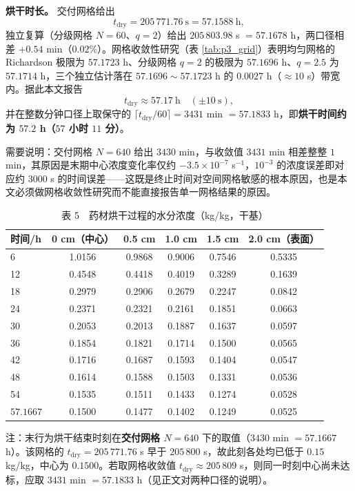 \textbf{烘干时长。} 交付网格给出
\begin{equation}
  t_{\text{dry}}=205\,771.76\ \text{s}=57.1588\ \text{h},
\end{equation}
独立复算（分级网格 $N=60$、$q=2$）给出 $205\,803.98$ s $=57.1678$ h，两口径相差 $+0.54$ min（$0.02\%$）。网格收敛性研究（表 \ref{tab:p3_grid}）表明均匀网格的 Richardson 极限为 $57.1723$ h、分级网格 $q=2$ 的极限为 $57.1696$ h、$q=2.5$ 为 $57.1714$ h，三个独立估计落在 $57.1696\sim57.1723$ h 的 $0.0027$ h（$\approx10$ s）带宽内。据此本文报告
\begin{equation}
  t_{\text{dry}}\approx57.17\ \text{h}\quad(\pm10\ \text{s}),
\end{equation}
并在整数分钟口径上取保守的 $\lceil t_{\text{dry}}/60\rceil=3431$ min $=57.1833$ h，即\textbf{烘干时间约为 $57.2$ h（$57$ 小时 $11$ 分）}。

需要说明：交付网格 $N=640$ 给出 $3430$ min，与收敛值 $3431$ min 相差整整 $1$ min，其原因是末期中心浓度变化率仅约 $-3.5\times10^{-7}$ s$^{-1}$，$10^{-3}$ 的浓度误差即对应约 $3000$ s 的时间误差——这既是终止时间对空间网格敏感的根本原因，也是本文必须做网格收敛性研究而不能直接报告单一网格结果的原因。

\begin{table}[H]
  \centering
  \caption{表 5　药材烘干过程的水分浓度（kg/kg，干基）}
  \label{tab:p3_tab5}
  \begin{tabular}{lccccc}
    \toprule
    时间/h & 0 cm（中心） & 0.5 cm & 1.0 cm & 1.5 cm & 2.0 cm（表面） \\
    \midrule
    6  & 1.0156 & 0.9868 & 0.9006 & 0.7546 & 0.5335 \\
    12 & 0.4548 & 0.4418 & 0.4019 & 0.3289 & 0.1639 \\
    18 & 0.2979 & 0.2906 & 0.2679 & 0.2247 & 0.0842 \\
    24 & 0.2371 & 0.2321 & 0.2161 & 0.1851 & 0.0663 \\
    30 & 0.2053 & 0.2013 & 0.1887 & 0.1637 & 0.0597 \\
    36 & 0.1854 & 0.1821 & 0.1714 & 0.1500 & 0.0565 \\
    42 & 0.1716 & 0.1687 & 0.1593 & 0.1404 & 0.0547 \\
    48 & 0.1614 & 0.1588 & 0.1503 & 0.1331 & 0.0536 \\
    54 & 0.1535 & 0.1511 & 0.1433 & 0.1274 & 0.0528 \\
    \midrule
    $57.1667$ & 0.1500 & 0.1477 & 0.1402 & 0.1249 & 0.0525 \\
    \bottomrule
  \end{tabular}

  \vspace{2pt}
  \parbox{0.92\textwidth}{\footnotesize 注：末行为烘干结束时刻在\textbf{交付网格 $N=640$} 下的取值（$3430$ min $=57.1667$ h）。该网格的 $t_{\text{dry}}=205\,771.76$ s 早于 $205\,800$ s，故此刻各处均已低于 $0.15$ kg/kg，中心为 $0.1500$。若取网格收敛值 $t_{\text{dry}}\approx205\,809$ s，则同一时刻中心尚未达标，应取 $3431$ min $=57.1833$ h（见正文对两种口径的说明）。}
\end{table}

